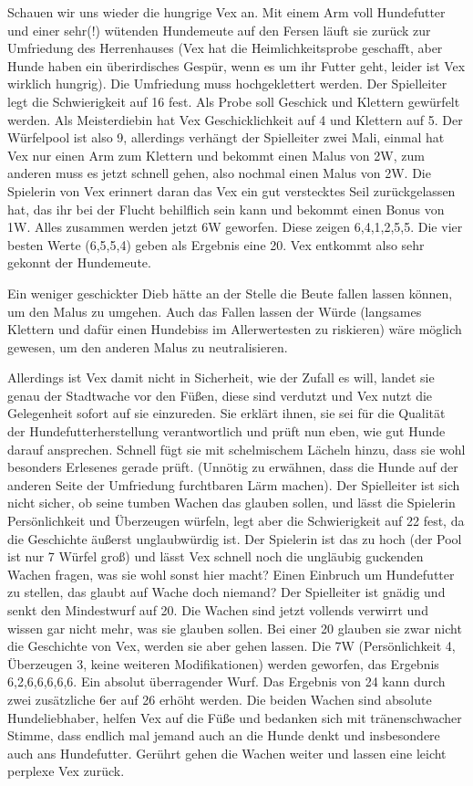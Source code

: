 \documentclass{article}
\begin{document}
Schauen wir uns wieder die hungrige Vex an. Mit einem Arm voll Hundefutter und einer sehr(!) wütenden Hundemeute auf den
Fersen läuft sie zurück zur Umfriedung des Herrenhauses (Vex hat die Heimlichkeitsprobe geschafft, aber Hunde haben ein
überirdisches Gespür, wenn es um ihr Futter geht, leider ist Vex wirklich hungrig). Die Umfriedung muss hochgeklettert
werden. Der Spielleiter legt die Schwierigkeit auf 16 fest. Als Probe soll Geschick und Klettern gewürfelt werden. Als
Meisterdiebin hat Vex Geschicklichkeit auf 4 und Klettern auf 5. Der Würfelpool ist also 9, allerdings verhängt der
Spielleiter zwei Mali, einmal hat Vex nur einen Arm zum Klettern und bekommt einen Malus von 2W, zum anderen muss es jetzt
schnell gehen, also nochmal einen Malus von 2W. Die Spielerin von Vex erinnert daran das Vex ein gut verstecktes Seil
zurückgelassen hat, das ihr bei der Flucht behilflich sein kann und bekommt einen Bonus von 1W. Alles zusammen werden
jetzt 6W geworfen. Diese zeigen 6,4,1,2,5,5. Die vier besten Werte (6,5,5,4) geben als Ergebnis eine 20. Vex entkommt
also sehr gekonnt der Hundemeute. 

Ein weniger geschickter Dieb hätte an der Stelle die Beute fallen lassen können, um den Malus zu umgehen. Auch das
Fallen lassen der Würde (langsames Klettern und dafür einen Hundebiss im Allerwertesten zu riskieren) wäre möglich
gewesen, um den anderen Malus zu neutralisieren.

Allerdings ist Vex damit nicht in Sicherheit, wie der Zufall es will, landet sie genau der Stadtwache vor den Füßen,
diese sind verdutzt und Vex nutzt die Gelegenheit sofort auf sie einzureden. Sie erklärt ihnen, sie sei für die
Qualität der Hundefutterherstellung verantwortlich und prüft nun eben, wie gut Hunde darauf ansprechen. Schnell fügt
sie mit schelmischem Lächeln hinzu, dass sie wohl besonders Erlesenes gerade prüft. (Unnötig zu erwähnen, dass die
Hunde auf der anderen Seite der Umfriedung furchtbaren Lärm machen). Der Spielleiter ist sich nicht sicher, ob seine
tumben Wachen das glauben sollen, und lässt die Spielerin Persönlichkeit und Überzeugen würfeln, legt aber die
Schwierigkeit auf 22 fest, da die Geschichte äußerst unglaubwürdig ist. Der Spielerin ist das zu hoch (der Pool ist
nur 7 Würfel groß) und lässt Vex schnell noch die ungläubig guckenden Wachen fragen, was sie wohl sonst hier macht?
Einen Einbruch um Hundefutter zu stellen, das glaubt auf Wache doch niemand? Der Spielleiter ist gnädig und senkt den
Mindestwurf auf 20. Die Wachen sind jetzt vollends verwirrt und wissen gar nicht mehr, was sie glauben sollen. Bei
einer 20 glauben sie zwar nicht die Geschichte von Vex, werden sie aber gehen lassen.
Die 7W (Persönlichkeit 4, Überzeugen 3, keine weiteren Modifikationen) werden geworfen, das Ergebnis 6,2,6,6,6,6,6.
Ein absolut überragender Wurf. Das Ergebnis von 24 kann durch zwei zusätzliche 6er auf 26 erhöht werden. Die beiden
Wachen sind absolute Hundeliebhaber, helfen Vex auf die Füße und bedanken sich mit tränenschwacher Stimme, dass
endlich mal jemand auch an die Hunde denkt und insbesondere auch ans Hundefutter. Gerührt gehen die Wachen weiter und
lassen eine leicht perplexe Vex zurück.
\end{document}
